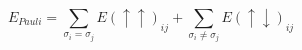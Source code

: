 \documentclass[12pt]{article}
\begin{document}
$$ 
E_{Pauli}  = \sum\limits_{\sigma _i  = \sigma _j } {E\left( { \uparrow  \uparrow } \right)_{ij}}  + \sum\limits_{\sigma _i  \ne \sigma _j } {E\left( { \uparrow  \downarrow } \right)_{ij}}
$$
\end{document}
